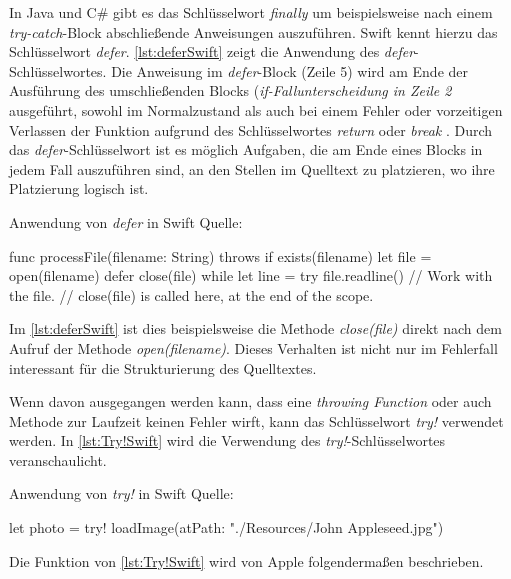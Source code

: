 In Java und C\# gibt es das Schlüsselwort \textit{finally} um beispielsweise nach einem \textit{try-catch}-Block abschließende Anweisungen auszuführen. 
Swift kennt hierzu das Schlüsselwort \textit{defer}.
\autoref{lst:deferSwift} zeigt die Anwendung des \textit{defer}-Schlüsselwortes.
Die Anweisung im \textit{defer}-Block (Zeile 5) wird am Ende der Ausführung des umschließenden Blocks (\textit{if-Fallunterscheidung in Zeile 2} ausgeführt, sowohl im Normalzustand als auch bei einem Fehler oder vorzeitigen Verlassen der Funktion aufgrund des Schlüsselwortes \textit{return} oder \textit{break} \cite[S.317]{Apple.2017}.
Durch das \textit{defer}-Schlüsselwort ist es möglich Aufgaben, die am Ende eines Blocks in jedem Fall auszuführen sind, an den Stellen im Quelltext zu platzieren, wo ihre Platzierung logisch ist.

\begin{listing}[H]
\caption{Anwendung von \textit{defer} in Swift Quelle: \cite[S.318]{Apple.2017}}
\label{lst:deferSwift}
\begin{SwiftCode}
func processFile(filename: String) throws {
    if exists(filename) {
        let file = open(filename)
        defer {
            close(file)
        }
        while let line = try file.readline() {
            // Work with the file.
        }
        // close(file) is called here, at the end of the scope.
    }
}
\end{SwiftCode}
\end{listing}

Im \autoref{lst:deferSwift} ist dies beispielsweise die Methode \textit{close(file)} direkt nach dem Aufruf der Methode \textit{open(filename)}. 
Dieses Verhalten ist nicht nur im Fehlerfall interessant für die Strukturierung des Quelltextes. 

Wenn davon ausgegangen werden kann, dass eine \textit{throwing Function} oder auch Methode zur Laufzeit keinen Fehler wirft, kann das Schlüsselwort \textit{try!} verwendet werden.
In \autoref{lst:Try!Swift} wird die Verwendung des \textit{try!}-Schlüsselwortes veranschaulicht.

\begin{listing}[H]
\caption{Anwendung von \textit{try!} in Swift Quelle: \cite[S.317]{Apple.2017}}
\label{lst:Try!Swift}
\begin{SwiftCode}
let photo = try! loadImage(atPath: "./Resources/John Appleseed.jpg")
\end{SwiftCode}
\end{listing}

Die Funktion von \autoref{lst:Try!Swift} wird von Apple folgendermaßen beschrieben.

